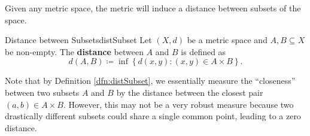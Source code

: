 \documentclass[math]{amznotes}
\theoremstyle{remark}
\begin{document}
Given any metric space, the metric will induce a distance between subsets of the space.
\begin{dfnbox}{Distance between Subsets}{distSubset}
    Let $\left(X, d\right)$ be a metric space and $A, B \subseteq X$ be non-empty. The {\color{red} \textbf{distance}} between $A$ and $B$ is defined as 
    \begin{equation*}
        d\left(A, B\right) \coloneqq \inf \left\{d\left(x, y\right) \colon \left(x, y\right) \in A \times B\right\}.
    \end{equation*}
\end{dfnbox}
Note that by Definition \ref{dfn:distSubset}, we essentially measure the ``closeness'' between two subsets $A$ and $B$ by the distance between the closest pair $\left(a, b\right) \in A \times B$. However, this may not be a very robust measure because two drastically different subsets could share a single common point, leading to a zero distance.
\end{document}
